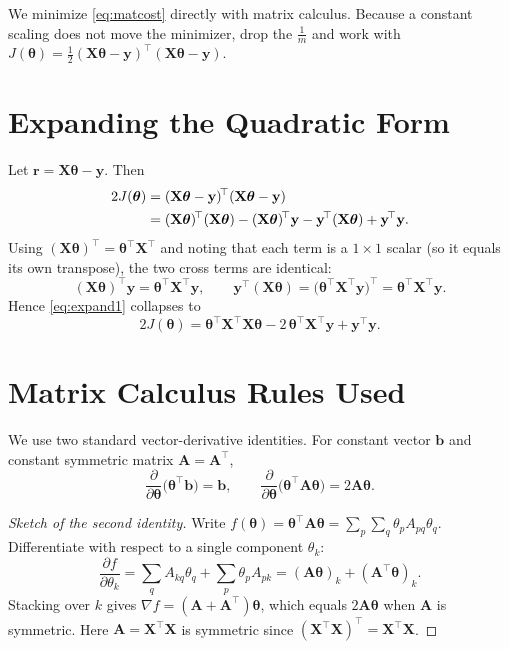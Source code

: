 \documentclass[11pt,a4paper]{report}
\theoremstyle{definition}
\theoremstyle{plain}
\theoremstyle{remark}
\newcommand{\vy}{\mathbf{y}}
\newcommand{\vw}{\bm{\theta}}          %
\newcommand{\Xmat}{\mathbf{X}}
\begin{document}
	We minimize \eqref{eq:matcost} directly with matrix calculus. Because a
	constant scaling does not move the minimizer, drop the $\tfrac1m$ and work with
	$J(\vw)=\tfrac12(\Xmat\vw-\vy)^{\!\top}(\Xmat\vw-\vy)$.
	
	\section{Expanding the Quadratic Form}
	Let $\mathbf{r}=\Xmat\vw-\vy$. Then
	\begin{align}
		2J(\vw)&=(\Xmat\vw-\vy)^{\!\top}(\Xmat\vw-\vy)\notag\\
		&=(\Xmat\vw)^{\!\top}(\Xmat\vw)
		-(\Xmat\vw)^{\!\top}\vy
		-\vy^{\!\top}(\Xmat\vw)
		+\vy^{\!\top}\vy .
		\label{eq:expand1}
	\end{align}
	Using $(\Xmat\vw)^{\!\top}=\vw^{\!\top}\Xmat^{\!\top}$ and noting that each term
	is a $1\times1$ scalar (so it equals its own transpose), the two cross terms
	are identical:
	\[
	(\Xmat\vw)^{\!\top}\vy=\vw^{\!\top}\Xmat^{\!\top}\vy,\qquad
	\vy^{\!\top}(\Xmat\vw)=\bigl(\vw^{\!\top}\Xmat^{\!\top}\vy\bigr)^{\!\top}
	=\vw^{\!\top}\Xmat^{\!\top}\vy .
	\]
	Hence \eqref{eq:expand1} collapses to
	\begin{equation}
		2J(\vw)=\vw^{\!\top}\Xmat^{\!\top}\Xmat\vw
		-2\,\vw^{\!\top}\Xmat^{\!\top}\vy
		+\vy^{\!\top}\vy .
		\label{eq:expand2}
	\end{equation}
	
	\section{Matrix Calculus Rules Used}
	We use two standard vector-derivative identities. For constant vector
	$\mathbf{b}$ and constant symmetric matrix $\mathbf{A}=\mathbf{A}^{\!\top}$,
	\begin{equation}
		\frac{\partial}{\partial\vw}\bigl(\vw^{\!\top}\mathbf{b}\bigr)=\mathbf{b},
		\qquad
		\frac{\partial}{\partial\vw}\bigl(\vw^{\!\top}\mathbf{A}\vw\bigr)=2\mathbf{A}\vw .
		\label{eq:matcalc}
	\end{equation}
	
	\begin{proof}[Sketch of the second identity]
		Write $f(\vw)=\vw^{\!\top}\mathbf{A}\vw=\sum_{p}\sum_{q}\theta_p A_{pq}\theta_q$.
		Differentiate with respect to a single component $\theta_k$:
		\[
		\frac{\partial f}{\partial\theta_k}
		=\sum_q A_{kq}\theta_q+\sum_p \theta_p A_{pk}
		=(\mathbf{A}\vw)_k+(\mathbf{A}^{\!\top}\vw)_k .
		\]
		Stacking over $k$ gives $\nabla f=(\mathbf{A}+\mathbf{A}^{\!\top})\vw$, which
		equals $2\mathbf{A}\vw$ when $\mathbf{A}$ is symmetric. Here
		$\mathbf{A}=\Xmat^{\!\top}\Xmat$ is symmetric since
		$(\Xmat^{\!\top}\Xmat)^{\!\top}=\Xmat^{\!\top}\Xmat$.
	\end{proof}
	
\end{document}
